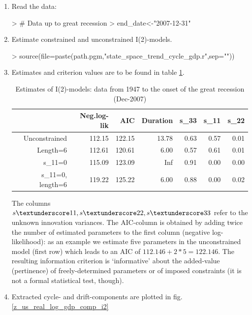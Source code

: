 \documentclass[a4paper]{book}
\begin{document}
\begin{enumerate}
\item Read the data:
\begin{Schunk}
\begin{Sinput}
> # Data up to great recession
> end_date<-"2007-12-31"
\end{Sinput}
\end{Schunk}
\item Estimate constrained and unconstrained I(2)-models.  
\begin{Schunk}
\begin{Sinput}
> source(file=paste(path.pgm,"state_space_trend_cycle_gdp.r",sep=""))
\end{Sinput}
\end{Schunk}

\item Estimates and criterion values are to be found in table \ref{z_ss_uc0_t_gr_i2}.
\begin{table}[ht]
\centering
\begin{tabular}{rrrrrrr}
  \hline
 & Neg.log-lik & AIC & Duration & s\_33 & s\_11 & s\_22 \\ 
  \hline
Unconstrained & 112.15 & 122.15 & 13.78 & 0.63 & 0.57 & 0.01 \\ 
  Length=6 & 112.61 & 120.61 & 6.00 & 0.57 & 0.61 & 0.01 \\ 
  s\_11=0 & 115.09 & 123.09 & Inf & 0.91 & 0.00 & 0.00 \\ 
  s\_11=0, length=6 & 119.22 & 125.22 & 6.00 & 0.88 & 0.00 & 0.02 \\ 
   \hline
\end{tabular}
\caption{Estimates of I(2)-models: data from 1947 to the onset of the great recession (Dec-2007)} 
\label{z_ss_uc0_t_gr_i2}
\end{table}The columns $s \textunderscore 11, s \textunderscore 22, s \textunderscore 33$ refer to the unknown innovation variances. The AIC-column is obtained by adding twice the number of estimated parameters to the first column (negative log-likelihood): as an example we estimate five parameters in the unconstrained model (first row) which leads to an AIC of $112.146+2*5=122.146$. The resulting information criterion is `informative' about the added-value (pertinence) of freely-determined parameters or of imposed constraints (it is not a formal statistical test, though).
\item Extracted cycle- and drift-components are plotted in fig.\ref{z_us_real_log_gdp_comp_i2}


\end{enumerate}
\end{document}
